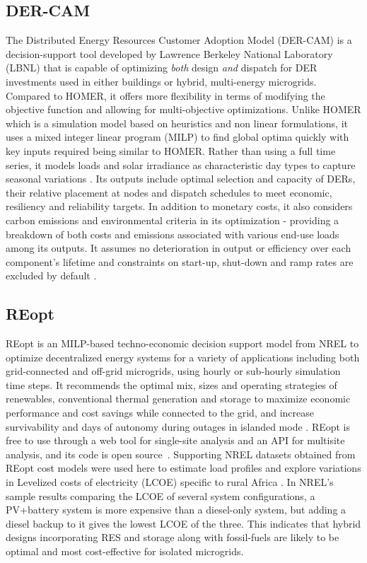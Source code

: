\documentclass[final,3p,times]{elsarticle}
\begin{document}
\subsection{DER-CAM}

The Distributed Energy Resources Customer Adoption Model (DER-CAM) is a decision-support tool developed by Lawrence Berkeley National Laboratory (LBNL) that is capable of optimizing \textit{both} design \textit{and} dispatch for DER investments used in either buildings or hybrid, multi-energy microgrids. Compared to HOMER, it offers more flexibility in terms of modifying the objective function and allowing for multi-objective optimizations. Unlike HOMER which is a simulation model based on heuristics and non linear formulations, it uses a mixed integer linear program (MILP) to find global optima quickly \cite{dercam} with key inputs required being similar to HOMER. Rather than using a full time series, it models loads and solar irradiance as characteristic day types to capture seasonal variations \cite{weng2016}. Its outputs include optimal selection and capacity of DERs, their relative placement at nodes and dispatch schedules to meet economic, resiliency and reliability targets. In addition to monetary costs, it also considers carbon emissions and environmental criteria in its optimization - providing a breakdown of both costs and emissions associated with various end-use loads among its outputs. It assumes no deterioration in output or efficiency over each component's lifetime and constraints on start-up, shut-down and ramp rates are excluded by default \cite{dercam}.

\subsection{REopt}

REopt is an MILP-based techno-economic decision support model from NREL to optimize decentralized energy systems for a variety of applications including both grid-connected and off-grid microgrids, using hourly or sub-hourly simulation time steps. It recommends the optimal mix, sizes and operating strategies of renewables, conventional thermal generation and storage to maximize economic performance and cost savings while connected to the grid, and increase survivability and days of autonomy during outages in islanded mode \cite{tools_summary}. REopt is free to use through a web tool for single-site analysis and an API for multisite analysis, and its code is open source~\cite{reopt_news}. Supporting NREL datasets obtained from REopt cost models were used here to estimate load profiles and explore variations in Levelized costs of electricity (LCOE) specific to rural Africa \cite{nrel_data}. In NREL's sample results comparing the LCOE of several system configurations, a PV+battery system is more expensive than a diesel-only system, but adding a diesel backup to it gives the lowest LCOE of the three. This indicates that hybrid designs incorporating RES and storage along with fossil-fuels are likely to be optimal and most cost-effective for isolated microgrids.
\end{document}
